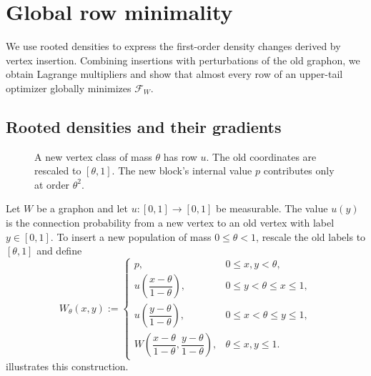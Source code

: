 \section{Global row minimality}\label{sec:upper-tail-row-minimality}

We use rooted densities to express the first-order density changes derived
by vertex insertion. Combining insertions with perturbations of the old
graphon, we obtain Lagrange multipliers and show that almost every row
of an upper-tail optimizer globally minimizes $\mathcal F_W$.

\subsection{Rooted densities and their gradients}\label{sec:rooted-densities}

\begin{figure}[htbp]
\centering
{}
\caption{A new vertex class of mass $\theta$ has row $u$.
The old coordinates are rescaled to $[\theta,1]$.
The new block's internal value $p$ contributes
only at order $\theta^2$.}
\label{fig:insertion}
\end{figure}

Let $W$ be a graphon and let $u:[0,1]\to[0,1]$ be measurable.
The value $u(y)$ is the connection probability from a new vertex to an
old vertex with label $y \in [0,1]$.  To insert a new population of mass
$0\le\theta<1$, rescale the old labels to $[\theta,1]$ and define
\begin{equation}\label{eq:vertex-insertion}
  W_\theta(x,y):=
  \begin{cases}
    p, & 0\le x,y<\theta,\\
    u\!\left(\dfrac{x-\theta}{1-\theta}\right),
      & 0\le y<\theta\le x\le1,\\
    u\!\left(\dfrac{y-\theta}{1-\theta}\right),
      & 0\le x<\theta\le y\le1,\\
    W\!\left(\dfrac{x-\theta}{1-\theta},
               \dfrac{y-\theta}{1-\theta}\right),
      & \theta\le x,y\le1.
  \end{cases}
\end{equation}
 illustrates this construction.

